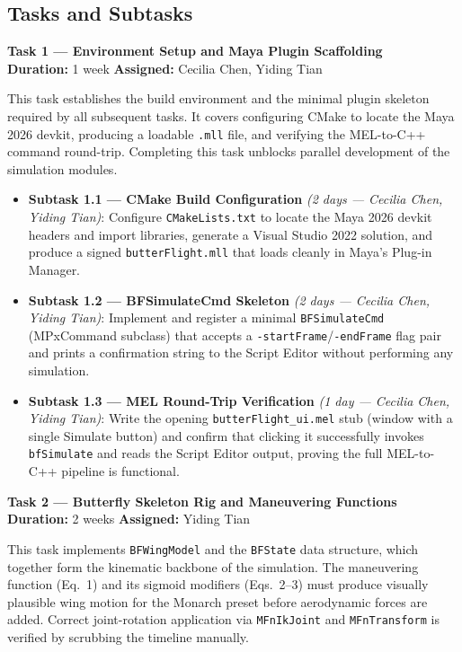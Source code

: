 \documentclass[12pt]{article}
\begin{document}
\subsection{Tasks and Subtasks}

\noindent\textbf{Task 1 --- Environment Setup and Maya Plugin Scaffolding}\\
\textbf{Duration:} 1 week \quad \textbf{Assigned:} Cecilia Chen, Yiding Tian

This task establishes the build environment and the minimal plugin skeleton required
by all subsequent tasks. It covers configuring CMake to locate the Maya 2026 devkit,
producing a loadable \texttt{.mll} file, and verifying the MEL-to-C++ command
round-trip. Completing this task unblocks parallel development of the simulation
modules.

\begin{itemize}
  \item \textbf{Subtask 1.1 --- CMake Build Configuration} \textit{(2 days --- Cecilia Chen, Yiding Tian)}: Configure
    \texttt{CMakeLists.txt} to locate the Maya 2026 devkit headers and import
    libraries, generate a Visual Studio 2022 solution, and produce a signed
    \texttt{butterFlight.mll} that loads cleanly in Maya's Plug-in Manager.
  \item \textbf{Subtask 1.2 --- BFSimulateCmd Skeleton} \textit{(2 days --- Cecilia Chen, Yiding Tian)}: Implement and register a
    minimal \texttt{BFSimulateCmd} (MPxCommand subclass) that accepts a
    \texttt{-startFrame}/\texttt{-endFrame} flag pair and prints a confirmation
    string to the Script Editor without performing any simulation.
  \item \textbf{Subtask 1.3 --- MEL Round-Trip Verification} \textit{(1 day --- Cecilia Chen, Yiding Tian)}: Write the opening
    \texttt{butterFlight\_ui.mel} stub (window with a single Simulate button) and
    confirm that clicking it successfully invokes \texttt{bfSimulate} and reads the
    Script Editor output, proving the full MEL-to-C++ pipeline is functional.
\end{itemize}

\bigskip
\noindent\textbf{Task 2 --- Butterfly Skeleton Rig and Maneuvering Functions}\\
\textbf{Duration:} 2 weeks \quad \textbf{Assigned:} Yiding Tian

This task implements \texttt{BFWingModel} and the \texttt{BFState} data structure,
which together form the kinematic backbone of the simulation. The maneuvering
function (Eq.~1) and its sigmoid modifiers (Eqs.~2--3) must produce visually
plausible wing motion for the Monarch preset before aerodynamic forces are added.
Correct joint-rotation application via \texttt{MFnIkJoint} and \texttt{MFnTransform}
is verified by scrubbing the timeline manually.
\end{document}
